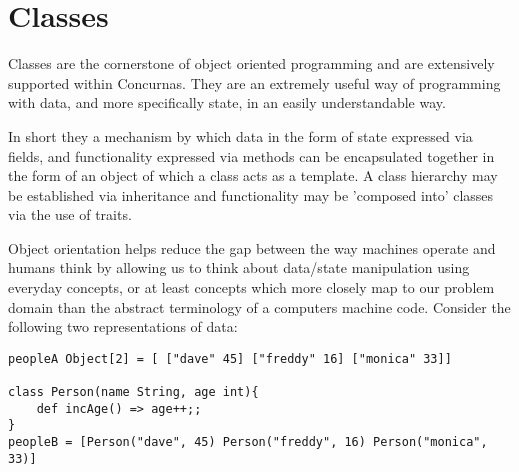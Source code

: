 \documentclass[conc-doc]{subfiles}
\begin{document}
	
	\chapter[Classes]{Classes}
	\label{ch:classes}



Classes are the cornerstone of object oriented programming and are extensively supported within Concurnas. They are an extremely useful way of programming with data, and more specifically state, in an easily understandable way. 

In short they a mechanism by which data in the form of state expressed via fields, and functionality expressed via methods can be encapsulated together in the form of an object of which a class acts as a template. A class hierarchy may be established via inheritance and functionality may be 'composed into' classes via the use of traits.

Object orientation helps reduce the gap between the way machines operate and humans think by allowing us to think about data/state manipulation using everyday concepts, or at least concepts which more closely map to our problem domain than the abstract terminology of a computers machine code. Consider the following two representations of data:

\begin{lstlisting}
peopleA Object[2] = [ ["dave" 45] ["freddy" 16] ["monica" 33]]

class Person(name String, age int){
	def incAge() => age++;;
}
peopleB = [Person("dave", 45) Person("freddy", 16) Person("monica", 33)]
\end{lstlisting}
\end{document}
